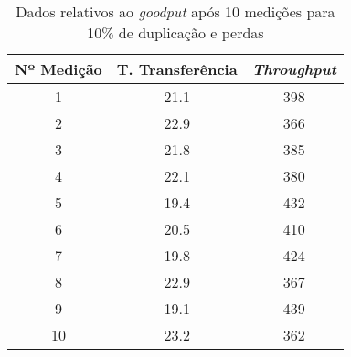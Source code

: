 \begin{table}[!ht]
\centering

\begin{tabular}{c c c}
\toprule
\toprule
	Nº Medição & T. Transferência & \emph{Throughput} \\ 
\midrule
1 & 21.1 & 398\\
2 & 22.9 & 366\\
3 & 21.8 & 385\\
4 & 22.1 & 380\\
5 & 19.4 & 432\\
6 & 20.5 & 410\\
7 & 19.8 & 424\\
8 & 22.9 & 367\\
9 & 19.1 & 439\\
10 & 23.2 & 362\\
\bottomrule
\end{tabular}
\caption{Dados relativos ao \emph{goodput} após 10 medições para 10\% de duplicação e perdas}
\label{tab:loss10dup10}
\end{table}
